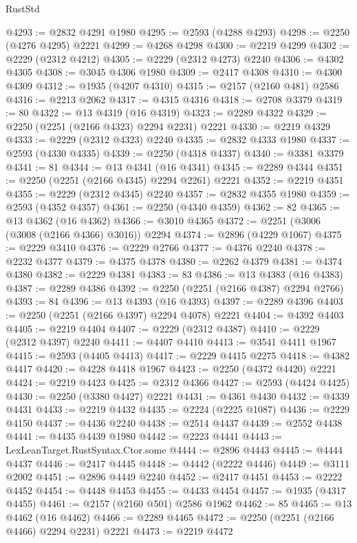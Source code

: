 \begin{lexlean}{RustStd}
\begin{coremodule}
@4293 := @2832 @4291 @1980
@4295 := @2593 (@4288 @4293)
@4298 := @2250 (@4276 @4295) @2221
@4299 := @4268 @4298
@4300 := @2219 @4299
@4302 := @2229 (@2312 @4212)
@4305 := @2229 (@2312 @4273) @2240
@4306 := @4302 @4305
@4308 := @3045 @4306 @1980
@4309 := @2417 @4308
@4310 := @4300 @4309
@4312 := @1935 (@4207 @4310)
@4315 := @2157 (@2160 @481) @2586
@4316 := @2213 @2062
@4317 := @4315 @4316
@4318 := @2708 @3379
@4319 := 80
@4322 := @13 @4319 (@16 @4319)
@4323 := @2289 @4322
@4329 := @2250 (@2251 (@2166 @4323) @2294 @2231) @2221
@4330 := @2219 @4329
@4333 := @2229 (@2312 @4323) @2240
@4335 := @2832 @4333 @1980
@4337 := @2593 (@4330 @4335)
@4339 := @2250 (@4318 @4337)
@4340 := @3381 @3379
@4341 := 81
@4344 := @13 @4341 (@16 @4341)
@4345 := @2289 @4344
@4351 := @2250 (@2251 (@2166 @4345) @2294 @2261) @2221
@4352 := @2219 @4351
@4355 := @2229 (@2312 @4345) @2240
@4357 := @2832 @4355 @1980
@4359 := @2593 (@4352 @4357)
@4361 := @2250 (@4340 @4359)
@4362 := 82
@4365 := @13 @4362 (@16 @4362)
@4366 := @3010 @4365
@4372 := @2251 (@3006 (@3008 (@2166 @4366) @3016)) @2294
@4374 := @2896 (@4229 @1067)
@4375 := @2229 @3410
@4376 := @2229 @2766
@4377 := @4376 @2240
@4378 := @2232 @4377
@4379 := @4375 @4378
@4380 := @2262 @4379
@4381 := @4374 @4380
@4382 := @2229 @4381
@4383 := 83
@4386 := @13 @4383 (@16 @4383)
@4387 := @2289 @4386
@4392 := @2250 (@2251 (@2166 @4387) @2294 @2766)
@4393 := 84
@4396 := @13 @4393 (@16 @4393)
@4397 := @2289 @4396
@4403 := @2250 (@2251 (@2166 @4397) @2294 @4078) @2221
@4404 := @4392 @4403
@4405 := @2219 @4404
@4407 := @2229 (@2312 @4387)
@4410 := @2229 (@2312 @4397) @2240
@4411 := @4407 @4410
@4413 := @3541 @4411 @1967
@4415 := @2593 (@4405 @4413)
@4417 := @2229 @4415 @2275
@4418 := @4382 @4417
@4420 := @4228 @4418 @1967
@4423 := @2250 (@4372 @4420) @2221
@4424 := @2219 @4423
@4425 := @2312 @4366
@4427 := @2593 (@4424 @4425)
@4430 := @2250 (@3380 @4427) @2221
@4431 := @4361 @4430
@4432 := @4339 @4431
@4433 := @2219 @4432
@4435 := @2224 (@2225 @1087)
@4436 := @2229 @4150
@4437 := @4436 @2240
@4438 := @2514 @4437
@4439 := @2552 @4438
@4441 := @4435 @4439 @1980
@4442 := @2223 @4441
@4443 := LexLeanTarget.RustSyntax.Ctor.some
@4444 := @2896 @4443
@4445 := @4444 @4437
@4446 := @2417 @4445
@4448 := @4442 (@2222 @4446)
@4449 := @3111 @2002
@4451 := @2896 @4449 @2240
@4452 := @2417 @4451
@4453 := @2222 @4452
@4454 := @4448 @4453
@4455 := @4433 @4454
@4457 := @1935 (@4317 @4455)
@4461 := @2157 (@2160 @501) @2586 @1962
@4462 := 85
@4465 := @13 @4462 (@16 @4462)
@4466 := @2289 @4465
@4472 := @2250 (@2251 (@2166 @4466) @2294 @2231) @2221
@4473 := @2219 @4472

\end{coremodule}
\end{lexlean}
